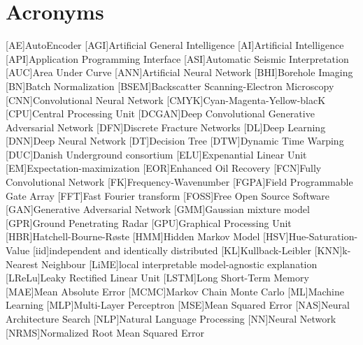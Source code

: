 \chapter{Acronyms}

\begin{acronym}[DCGANS]
[AE]{AutoEncoder}
[AGI]{Artificial General Intelligence}
[AI]{Artificial Intelligence}
[API]{Application Programming Interface}
[ASI]{Automatic Seismic Interpretation}
[AUC]{Area Under Curve}
[ANN]{Artificial Neural Network}
[BHI]{Borehole Imaging}
[BN]{Batch Normalization}
[BSEM]{Backscatter Scanning-Electron Microscopy}
[CNN]{Convolutional Neural Network}
[CMYK]{Cyan-Magenta-Yellow-blacK}
[CPU]{Central Processing Unit}
[DCGAN]{Deep Convolutional Generative Adversarial Network}
[DFN]{Discrete Fracture Networks}
[DL]{Deep Learning}
[DNN]{Deep Neural Network}
[DT]{Decision Tree}
[DTW]{Dynamic Time Warping}
[DUC]{Danish Underground consortium}
[ELU]{Expenantial Linear Unit}
[EM]{Expectation-maximization}
[EOR]{Enhanced Oil Recovery}
[FCN]{Fully Convolutional Network}
[FK]{Frequency-Wavenumber}
[FGPA]{Field Programmable Gate Array}
[FFT]{Fast Fourier transform}
[FOSS]{Free Open Source Software}
[GAN]{Generative Adversarial Network}
[GMM]{Gaussian mixture model}
[GPR]{Ground Penetrating Radar}
[GPU]{Graphical Processing Unit}
[HBR]{Hatchell-Bourne-R{\o}ste}
[HMM]{Hidden Markov Model} 
[HSV]{Hue-Saturation-Value}
[iid]{independent and identically distributed}
[KL]{Kullback-Leibler}
[KNN]{k-Nearest Neighbour}
[LiME]{local interpretable model-agnostic explanation}
[LReLu]{Leaky Rectified Linear Unit}
[LSTM]{Long Short-Term Memory}
[MAE]{Mean Absolute Error}
[MCMC]{Markov Chain Monte Carlo}
[ML]{Machine Learning}
[MLP]{Multi-Layer Perceptron}
[MSE]{Mean Squared Error}
[NAS]{Neural Architecture Search}
[NLP]{Natural Language Processing}
[NN]{Neural Network}
[NRMS]{Normalized Root Mean Squared Error}

\end{acronym}
